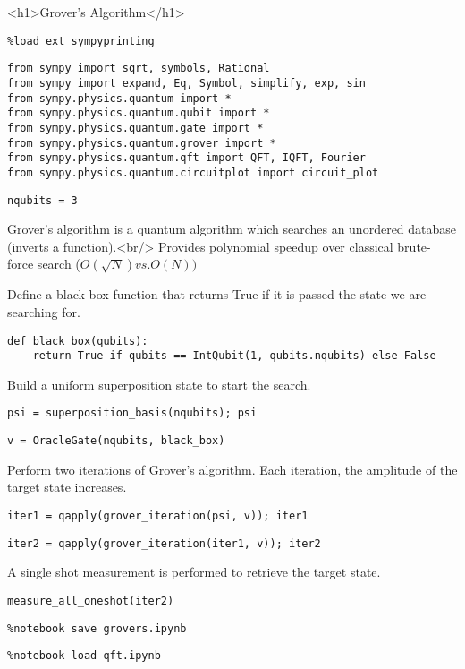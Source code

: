 <h1>Grover's Algorithm</h1>

\begin{verbatim}
%load_ext sympyprinting
\end{verbatim}

\begin{verbatim}
from sympy import sqrt, symbols, Rational
from sympy import expand, Eq, Symbol, simplify, exp, sin
from sympy.physics.quantum import *
from sympy.physics.quantum.qubit import *
from sympy.physics.quantum.gate import *
from sympy.physics.quantum.grover import *
from sympy.physics.quantum.qft import QFT, IQFT, Fourier
from sympy.physics.quantum.circuitplot import circuit_plot
\end{verbatim}

\begin{verbatim}
nqubits = 3
\end{verbatim}

Grover's algorithm is a quantum algorithm which searches an unordered database
(inverts a function).<br/> Provides polynomial speedup over classical brute-
force search ($O(\sqrt{N}) vs. O(N))$

Define a black box function that returns True if it is passed the state we are
searching for.

\begin{verbatim}
def black_box(qubits):
    return True if qubits == IntQubit(1, qubits.nqubits) else False
\end{verbatim}

Build a uniform superposition state to start the search.

\begin{verbatim}
psi = superposition_basis(nqubits); psi
\end{verbatim}

\begin{verbatim}
v = OracleGate(nqubits, black_box)
\end{verbatim}

Perform two iterations of Grover's algorithm.  Each iteration, the amplitude of
the target state increases.

\begin{verbatim}
iter1 = qapply(grover_iteration(psi, v)); iter1
\end{verbatim}

\begin{verbatim}
iter2 = qapply(grover_iteration(iter1, v)); iter2
\end{verbatim}

A single shot measurement is performed to retrieve the target state.

\begin{verbatim}
measure_all_oneshot(iter2)
\end{verbatim}

\begin{verbatim}
%notebook save grovers.ipynb
\end{verbatim}

\begin{verbatim}
%notebook load qft.ipynb
\end{verbatim}

